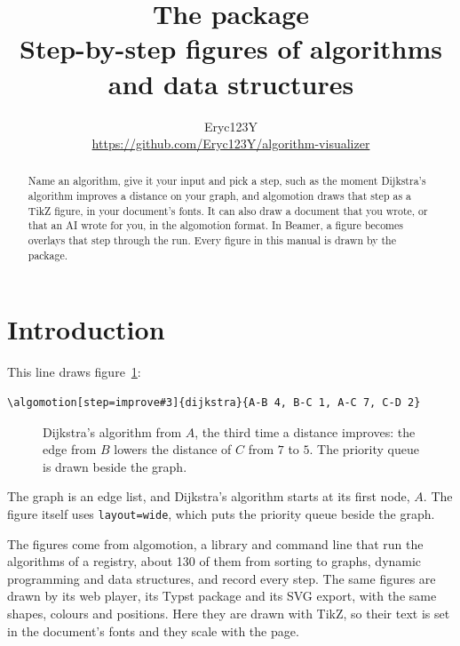 \documentclass[11pt]{article}
\title{The \pkg{algomotion} package\\[0.3em]
  \large Step-by-step figures of algorithms and data structures}
\author{Eryc123Y\\
  \url{https://github.com/Eryc123Y/algorithm-visualizer}}
\date{\algomotionversion}
\newcommand\pkg[1]{\textsf{#1}}
\begin{document}
\maketitle

\begin{abstract}
  Name an algorithm, give it your input and pick a step, such as the moment
  Dijkstra's algorithm improves a distance on your graph, and \pkg{algomotion}
  draws that step as a TikZ figure, in your document's fonts. It can also draw
  a document that you wrote, or that an AI wrote for you, in the algomotion
  format. In Beamer, a figure becomes overlays that step through the run.
  Every figure in this manual is drawn by the package.
\end{abstract}

\tableofcontents

\section{Introduction}

\noindent This line draws figure~\ref{fig:dijkstra}:

\begin{lstlisting}
\algomotion[step=improve#3]{dijkstra}{A-B 4, B-C 1, A-C 7, C-D 2}
\end{lstlisting}

\begin{figure}[htbp]
  \centering
  \caption{Dijkstra's algorithm from $A$, the third time a distance improves:
    the edge from $B$ lowers the distance of $C$ from $7$ to $5$. The
    priority queue is drawn beside the graph.}
  \label{fig:dijkstra}
\end{figure}

\noindent The graph is an edge list, and Dijkstra's algorithm starts at its
first node, $A$. The figure itself uses \texttt{layout=wide}, which puts the
priority queue beside the graph.

The figures come from algomotion, a library and command line that run the
algorithms of a registry, about 130 of them from sorting to graphs, dynamic
programming and data structures, and record every step. The same figures are
drawn by its web player, its Typst package and its SVG export, with the same
shapes, colours and positions. Here they are drawn with TikZ, so their text
is set in the document's fonts and they scale with the page.
\end{document}
